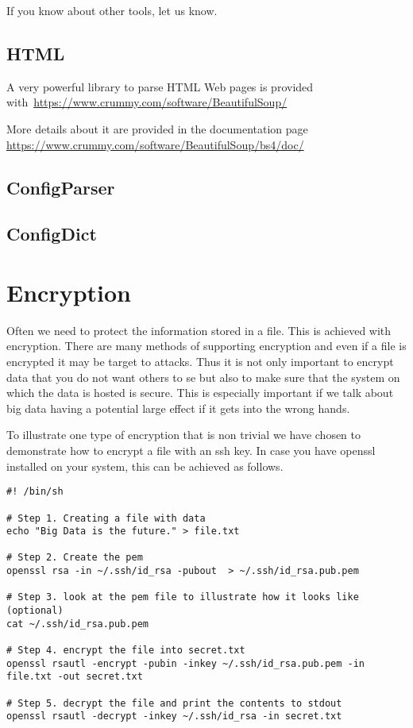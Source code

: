 If you know about other tools, let us know.


\subsection{HTML}

A very powerful library to parse HTML Web pages is provided
with~\url{https://www.crummy.com/software/BeautifulSoup/}

More details about it are provided in the documentation page
\url{https://www.crummy.com/software/BeautifulSoup/bs4/doc/}


\subsection{ConfigParser}


\subsection{ConfigDict}


\section{Encryption}

Often we need to protect the information stored in a file. This is
achieved with encryption. There are many methods of supporting
encryption and even if a file is encrypted it may be target to
attacks. Thus it is not only important to encrypt data that you do not
want others to se but also to make sure that the system on which the
data is hosted is secure. This is especially important if we talk
about big data having a potential large effect if it gets into the
wrong hands. 

To illustrate one type of encryption that is non trivial we have
chosen to demonstrate how to encrypt a file with an ssh key. In case
you have openssl installed on your system, this can be achieved as follows.


\begin{verbatim}
#! /bin/sh

# Step 1. Creating a file with data
echo "Big Data is the future." > file.txt

# Step 2. Create the pem 
openssl rsa -in ~/.ssh/id_rsa -pubout  > ~/.ssh/id_rsa.pub.pem

# Step 3. look at the pem file to illustrate how it looks like (optional)
cat ~/.ssh/id_rsa.pub.pem

# Step 4. encrypt the file into secret.txt
openssl rsautl -encrypt -pubin -inkey ~/.ssh/id_rsa.pub.pem -in file.txt -out secret.txt

# Step 5. decrypt the file and print the contents to stdout
openssl rsautl -decrypt -inkey ~/.ssh/id_rsa -in secret.txt
\end{verbatim}

